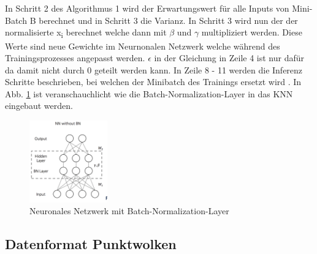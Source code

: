 \documentclass{llncs}
\begin{document}
~\\\\
In Schritt 2 des Algorithmus 1 wird der Erwartungswert für alle Inputs von Mini-Batch B berechnet und in Schritt 3 die Varianz. In Schritt 3 wird nun der der normalisierte x\textsubscript{i} berechnet welche dann mit $\beta$ und $\gamma$ multipliziert werden. Diese Werte sind neue Gewichte im Neurnonalen Netzwerk welche während des Trainingsprozesses angepasst werden. $\epsilon$ in der Gleichung in Zeile 4 ist nur dafür da damit nicht durch 0 geteilt werden kann. In Zeile 8 - 11 werden die Inferenz Schritte beschrieben, bei welchen der Minibatch des Trainings ersetzt wird \cite{batchnorm}. In Abb. \ref{fig:Bild6} ist veranschauchlicht wie die Batch-Normalization-Layer in das KNN eingebaut werden. 

\begin{figure}[htbp] 
	\centering
	\includegraphics[width=0.3\textwidth]{batchnorm.png}
	\caption{Neuronales Netzwerk mit Batch-Normalization-Layer\protect\cite{batchnormweb}}
	\label{fig:Bild6}
\end{figure}

\subsection{Datenformat Punktwolken}\label{sec:punktwolken}
\end{document}
